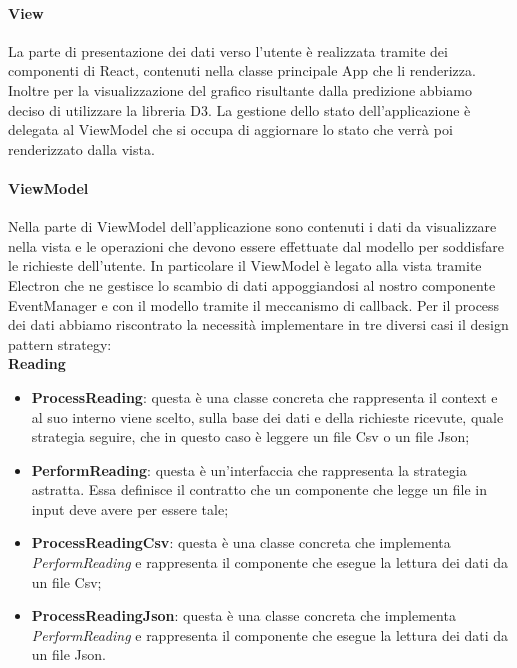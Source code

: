 			\paragraph{View}
			La parte di presentazione dei dati verso l'utente è realizzata tramite dei componenti di React, contenuti nella classe principale App che li renderizza. Inoltre per la visualizzazione del grafico risultante dalla predizione abbiamo deciso di utilizzare la libreria D3. 
			La gestione dello stato dell'applicazione è delegata al ViewModel che si occupa di aggiornare lo stato che verrà poi renderizzato dalla vista. 	
			\paragraph{ViewModel}
			Nella parte di ViewModel dell'applicazione sono contenuti i dati da visualizzare nella vista e le operazioni che devono essere effettuate dal modello per soddisfare le richieste dell'utente. In particolare il ViewModel è legato alla vista tramite Electron che ne gestisce lo scambio di dati appoggiandosi al nostro componente EventManager e con il modello tramite il meccanismo di callback.
			Per il process dei dati abbiamo riscontrato la necessità implementare in tre diversi casi il design pattern strategy: \\
			\textbf{Reading} \mbox{} \\ 
			\begin{itemize}
				\item \textbf{ProcessReading}: questa è una classe concreta che rappresenta il context e al suo interno viene scelto, sulla base dei dati e della richieste ricevute, quale strategia seguire, che in questo caso è leggere un file Csv o un file Json;
				\item \textbf{PerformReading}: questa è un'interfaccia che rappresenta la strategia astratta. Essa definisce il contratto che un componente che legge un file in input deve avere per essere tale;
				\item \textbf{ProcessReadingCsv}: questa è una classe concreta che implementa \textit{PerformReading} e rappresenta il componente che esegue la lettura dei dati da un file Csv;
				\item \textbf{ProcessReadingJson}: questa è una classe concreta che implementa \textit{PerformReading} e rappresenta il componente che esegue la lettura dei dati da un file Json.
			\end{itemize}
			\mbox{}
